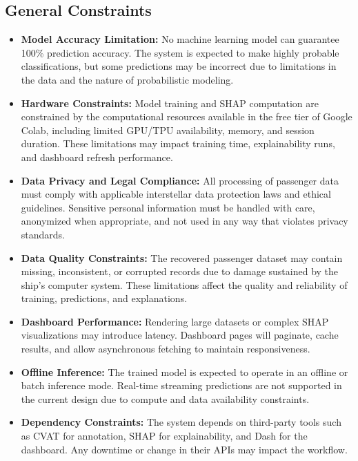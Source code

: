 \documentclass[15pt]{article}
\begin{document}
\subsection{General Constraints}
\begin{itemize}
    \item \textbf{Model Accuracy Limitation:} No machine learning model can guarantee 100\% prediction accuracy. The system is expected to make highly probable classifications, but some predictions may be incorrect due to limitations in the data and the nature of probabilistic modeling.
    
    \item \textbf{Hardware Constraints:} Model training and SHAP computation are constrained by the computational resources available in the free tier of Google Colab, including limited GPU/TPU availability, memory, and session duration. These limitations may impact training time, explainability runs, and dashboard refresh performance.
    
    \item \textbf{Data Privacy and Legal Compliance:} All processing of passenger data must comply with applicable interstellar data protection laws and ethical guidelines. Sensitive personal information must be handled with care, anonymized when appropriate, and not used in any way that violates privacy standards.
    
    \item \textbf{Data Quality Constraints:} The recovered passenger dataset may contain missing, inconsistent, or corrupted records due to damage sustained by the ship’s computer system. These limitations affect the quality and reliability of training, predictions, and explanations.
    
    \item \textbf{Dashboard Performance:} Rendering large datasets or complex SHAP visualizations may introduce latency. Dashboard pages will paginate, cache results, and allow asynchronous fetching to maintain responsiveness.
    
    \item \textbf{Offline Inference:} The trained model is expected to operate in an offline or batch inference mode. Real-time streaming predictions are not supported in the current design due to compute and data availability constraints.
    
    \item \textbf{Dependency Constraints:} The system depends on third-party tools such as CVAT for annotation, SHAP for explainability, and Dash for the dashboard. Any downtime or change in their APIs may impact the workflow.
\end{itemize}
\end{document}

